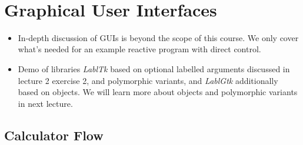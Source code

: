 \documentclass{beamer}
\newcommand{\tmem}[1]{{\em #1\/}}
\begin{document}
\

\section{Graphical User Interfaces}

\begin{itemize}
  \item In-depth discussion of GUIs is beyond the scope of this course. We
  only cover what's needed for an example reactive program with direct
  control.
  
  \item Demo of libraries {\tmem{LablTk}} based on optional labelled arguments
  discussed in lecture 2 exercise 2, and polymorphic variants, and
  {\tmem{LablGtk}} additionally based on objects. We will learn more about
  objects and polymorphic variants in next lecture.
\end{itemize}

\subsection{Calculator Flow}
\end{document}
